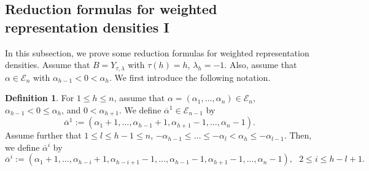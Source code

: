 \documentclass[11pt,oneside]{amsart}
\theoremstyle{plain}
\theoremstyle{definition}
\newtheorem{definition}[theorem]{Definition}
\theoremstyle{remark}
\newcommand{\tx}[1]{\text{#1}}
\newcommand{\CE}{{\mathcal E}}
\numberwithin{equation}{section}
\begin{document}
	
	\subsection{Reduction formulas for weighted representation densities I}\label{subsection2.2}
	In this subsection, we prove some reduction formulas for weighted representation densities. Assume that $B=Y_{\tau, \lambda}$ with $\tau(h)=h$, $\lambda_h=-1$. Also, assume that $\alpha \in \CE_n$ with $\alpha_{h-1}<0<\alpha_h$. We first introduce the following notation.
	
	\begin{definition}\label{definition2.9}
		For $1 \leq h \leq n$, assume that $\alpha=(\alpha_1,\dots,\alpha_n) \in \CE_n$, $\alpha_{h-1} < 0 \leq \alpha_h$, and $0<\alpha_{h+1}$. We define $\overline{\alpha}^{1} \in \CE_{n-1}$ by
		\begin{equation*}
			\overline{\alpha}^{1}:=(\alpha_1+1,\dots,\alpha_{h-1}+1,\alpha_{h+1}-1,\dots,\alpha_n-1).
		\end{equation*}
		Assume further that $1 \leq l \leq h-1 \leq n$, $-\alpha_{h-1} \leq \dots \leq -\alpha_{l}<\alpha_h \leq -\alpha_{l-1}$. Then, we define $\overline{\alpha}^{i}$ by
		\begin{equation*}
			\overline{\alpha}^{i}:=(\alpha_1+1,\dots,\alpha_{h-i}+1,\alpha_{h-i+1}-1,\dots,\alpha_{h-1}-1,\alpha_{h+1}-1,\dots,\alpha_n-1), \tx{ }2 \leq i \leq h-l+1.
		\end{equation*}
	\end{definition}
	
	
	
\end{document}
